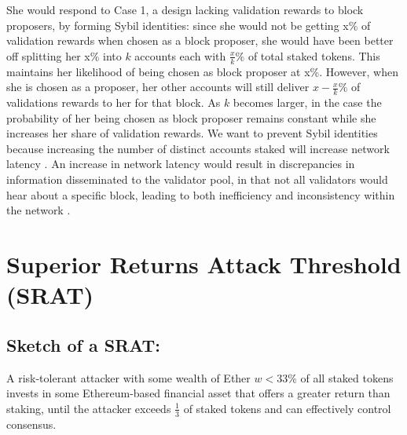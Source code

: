 \documentclass{article}
\renewcommand{\|}{\;|\;}
\begin{document}
She would respond to Case 1, a design lacking validation rewards to block proposers, by forming Sybil identities: since she would not be getting x\% of validation rewards when chosen as a block proposer, she would have been better off splitting her x\% into ${k}$ accounts each with $\frac{x}{k}\%$ of total staked tokens. This maintains her likelihood of being chosen as block proposer at  x\%. However, when she is chosen as a proposer, her other accounts will still deliver $x-\frac{x}{k}\%$ of validations rewards to her for that block. As ${k}$ becomes larger, in the case the probability of her being chosen as block proposer remains constant while she increases her share of validation rewards.\newline \newline
We want to prevent Sybil identities because increasing the number of distinct accounts staked will increase network latency \cite{buterin17}. An increase in network latency would result in discrepancies in information disseminated to the validator pool, in that not all validators would hear about a specific block, leading to both inefficiency and inconsistency within the network \cite{Kwon2016}.

\section{Superior Returns Attack Threshold (SRAT)}

\subsection{Sketch of a SRAT:}
A risk-tolerant attacker with some wealth of Ether $w < 33$\% of all staked tokens invests in some Ethereum-based financial asset that offers a greater return than staking, until the attacker exceeds $\frac{1}{3}$ of staked tokens and can effectively control consensus.\newline
\end{document}
